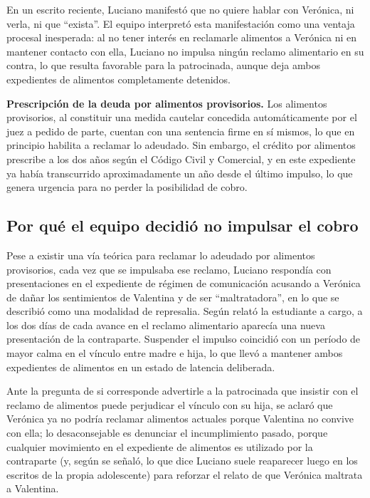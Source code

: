 \documentclass[12pt,oneside]{book}
\begin{document}
En un escrito reciente, Luciano manifestó que no quiere hablar con Verónica, ni verla, ni que ``exista''. El equipo interpretó esta manifestación como una ventaja procesal inesperada: al no tener interés en reclamarle alimentos a Verónica ni en mantener contacto con ella, Luciano no impulsa ningún reclamo alimentario en su contra, lo que resulta favorable para la patrocinada, aunque deja ambos expedientes de alimentos completamente detenidos.

\begin{important}
\textbf{Prescripción de la deuda por alimentos provisorios.} Los alimentos provisorios, al constituir una medida cautelar concedida automáticamente por el juez a pedido de parte, cuentan con una sentencia firme en sí mismos, lo que en principio habilita a reclamar lo adeudado. Sin embargo, el crédito por alimentos prescribe a los dos años según el Código Civil y Comercial, y en este expediente ya había transcurrido aproximadamente un año desde el último impulso, lo que genera urgencia para no perder la posibilidad de cobro.
\end{important}

\subsection{Por qué el equipo decidió no impulsar el cobro}

Pese a existir una vía teórica para reclamar lo adeudado por alimentos provisorios, cada vez que se impulsaba ese reclamo, Luciano respondía con presentaciones en el expediente de régimen de comunicación acusando a Verónica de dañar los sentimientos de Valentina y de ser ``maltratadora'', en lo que se describió como una modalidad de represalia. Según relató la estudiante a cargo, a los dos días de cada avance en el reclamo alimentario aparecía una nueva presentación de la contraparte. Suspender el impulso coincidió con un período de mayor calma en el vínculo entre madre e hija, lo que llevó a mantener ambos expedientes de alimentos en un estado de latencia deliberada.

Ante la pregunta de si corresponde advertirle a la patrocinada que insistir con el reclamo de alimentos puede perjudicar el vínculo con su hija, se aclaró que Verónica ya no podría reclamar alimentos actuales porque Valentina no convive con ella; lo desaconsejable es denunciar el incumplimiento pasado, porque cualquier movimiento en el expediente de alimentos es utilizado por la contraparte (y, según se señaló, lo que dice Luciano suele reaparecer luego en los escritos de la propia adolescente) para reforzar el relato de que Verónica maltrata a Valentina.
\end{document}
